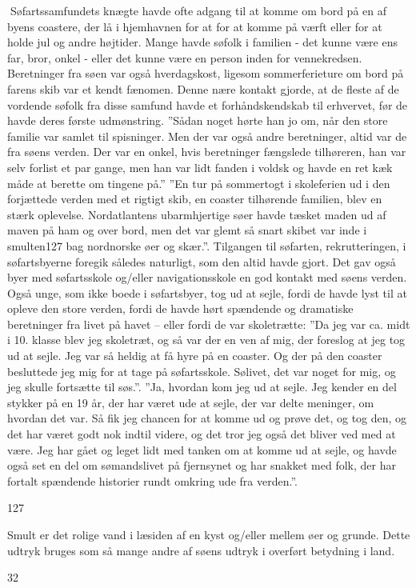 Søfartssamfundets knægte havde ofte adgang til at komme om bord på en
af byens coastere, der lå i hjemhavnen for at for at komme på værft
eller for at holde jul og andre højtider. Mange havde søfolk i familien
- det kunne være ens far, bror, onkel - eller det kunne være en person
inden for vennekredsen. Beretninger fra søen var også hverdagskost,
ligesom sommerferieture om bord på farens skib var et kendt fænomen.
Denne nære kontakt gjorde, at de fleste af de vordende søfolk fra disse
samfund havde et forhåndskendskab til erhvervet, før de havde deres
første udmønstring. ''Sådan noget hørte han jo om, når den store familie
var samlet til spisninger. Men der var også andre beretninger, altid var
de fra søens verden. Der var en onkel, hvis beretninger fængslede
tilhøreren, han var selv forlist et par gange, men han var lidt fanden i
voldsk og havde en ret kæk måde at berette om tingene på.'' ''En tur på
sommertogt i skoleferien ud i den forjættede verden med et rigtigt skib,
en coaster tilhørende familien, blev en stærk oplevelse. Nordatlantens
ubarmhjertige søer havde tæsket maden ud af maven på ham og over bord,
men det var glemt så snart skibet var inde i smulten127 bag nordnorske
øer og skær.''. Tilgangen til søfarten, rekrutteringen, i søfartsbyerne
foregik således naturligt, som den altid havde gjort. Det gav også byer
med søfartsskole og/eller navigationsskole en god kontakt med søens
verden. Også unge, som ikke boede i søfartsbyer, tog ud at sejle, fordi
de havde lyst til at opleve den store verden, fordi de havde hørt
spændende og dramatiske beretninger fra livet på havet -- eller fordi de
var skoletrætte: ''Da jeg var ca. midt i 10. klasse blev jeg skoletræt,
og så var der en ven af mig, der foreslog at jeg tog ud at sejle. Jeg
var så heldig at få hyre på en coaster. Og der på den coaster besluttede
jeg mig for at tage på søfartsskole. Sølivet, det var noget for mig, og
jeg skulle fortsætte til søs.''. ''Ja, hvordan kom jeg ud at sejle. Jeg
kender en del stykker på en 19 år, der har været ude at sejle, der var
delte meninger, om hvordan det var. Så fik jeg chancen for at komme ud
og prøve det, og tog den, og det har været godt nok indtil videre, og
det tror jeg også det bliver ved med at være. Jeg har gået og leget lidt
med tanken om at komme ud at sejle, og havde også set en del om
sømandslivet på fjernsynet og har snakket med folk, der har fortalt
spændende historier rundt omkring ude fra verden.''.

127

Smult er det rolige vand i læsiden af en kyst og/eller mellem øer og
grunde. Dette udtryk bruges som så mange andre af søens udtryk i
overført betydning i land.

32
